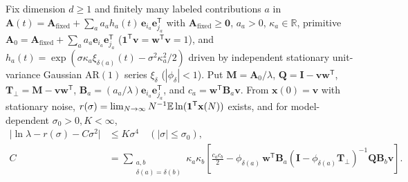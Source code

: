 \begin{theorem}\label{thm:ring-rem-ar1}
Fix dimension $d \ge 1$ and finitely many labeled contributions $a$ in $\mathbf{A}(t) = \mathbf{A}_{\mathrm{fixed}} + \sum_a a_a h_a(t)\,\mathbf{e}_{i_a}\mathbf{e}_{j_a}^{\mathsf{T}}$ with $\mathbf{A}_{\mathrm{fixed}} \ge \mathbf{0}$, $a_a > 0$, $\kappa_a \in \mathbb{R}$, primitive $\mathbf{A}_0 = \mathbf{A}_{\mathrm{fixed}} + \sum_a a_a\mathbf{e}_{i_a}\mathbf{e}_{j_a}^{\mathsf{T}}$ ($\mathbf{1}^{\mathsf{T}}\mathbf{v} = \mathbf{w}^{\mathsf{T}}\mathbf{v} = 1$), and $h_a(t) = \exp(\sigma\kappa_a\xi_{\delta(a)}(t) - \sigma^2\kappa_a^2/2)$ driven by independent stationary unit-variance Gaussian $\mathrm{AR}(1)$ series $\xi_\delta$ ($|\phi_\delta| < 1$). Put $\mathbf{M} = \mathbf{A}_0/\lambda$, $\mathbf{Q} = \mathbf{I} - \mathbf{v}\mathbf{w}^{\mathsf{T}}$, $\mathbf{T}_\perp = \mathbf{M} - \mathbf{v}\mathbf{w}^{\mathsf{T}}$, $\mathbf{B}_a = (a_a/\lambda)\mathbf{e}_{i_a}\mathbf{e}_{j_a}^{\mathsf{T}}$, and $c_a = \mathbf{w}^{\mathsf{T}}\mathbf{B}_a\mathbf{v}$. From $\mathbf{x}(0) = \mathbf{v}$ with stationary noise, $r(\sigma) = \lim_{N \to \infty} N^{-1}\mathbb{E}\ln(\mathbf{1}^{\mathsf{T}}\mathbf{x}(N))$ exists, and for model-dependent $\sigma_0 > 0, K < \infty$,
\begin{equation}
\begin{aligned}
\bigl|\ln\lambda - r(\sigma) - C\sigma^2\bigr| &\le K\sigma^4 \quad (|\sigma| \le \sigma_0), \\
C &= \sum_{\substack{a,b\\ \delta(a)=\delta(b)}} \kappa_a\kappa_b \left[ \frac{c_a c_b}{2} - \phi_{\delta(a)}\,\mathbf{w}^{\mathsf{T}}\mathbf{B}_a(\mathbf{I} - \phi_{\delta(a)}\mathbf{T}_\perp)^{-1}\mathbf{Q}\mathbf{B}_b\mathbf{v} \right].
\end{aligned}
\label{eq:ring-rem-ar1}
\end{equation}
\end{theorem}

